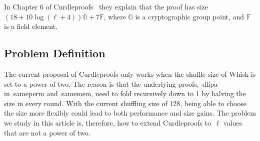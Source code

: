 In Chapter 6 of Curdleproofs~\cite{Curdleproofs} they explain that the proof has size~$(18+10 \log(\ell+4))\mathbb{G}+7\mathbb{F}$, where $\mathbb{G}$ is a cryptographic group point, and $\mathbb{F}$ is a field element.

\subsection{Problem Definition}\label{subsec:problem-definition}
The current proposal of Curdleproofs only works when the shuffle size of Whisk is set to a power of two.
The reason is that the underlying proofs,~\gls{dlipa} in~\gls{sameperm} and~\gls{samemsm}, need to fold recursively down to 1 by halving the size in every round.
With the current shuffling size of 128, being able to choose the size more flexibly could lead to both performance and size gains.
The problem we study in this article is, therefore, how to extend Curdleproofs to~$\ell$ values that are not a power of two.

